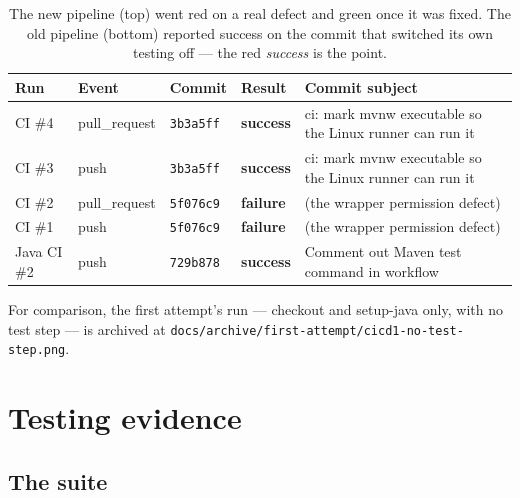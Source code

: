 \documentclass[11pt,a4paper]{article}
\newcommand{\code}[1]{\texttt{\small #1}}
\begin{document}
\begin{table}[h]
\centering
\small
\begin{tabularx}{\textwidth}{@{}l l l l X@{}}
\toprule
\textbf{Run} & \textbf{Event} & \textbf{Commit} & \textbf{Result} & \textbf{Commit subject} \\
\midrule
CI \#4 & pull\_request & \code{3b3a5ff} & \textcolor{good}{\textbf{success}} & ci: mark mvnw executable so the Linux runner can run it \\
CI \#3 & push & \code{3b3a5ff} & \textcolor{good}{\textbf{success}} & ci: mark mvnw executable so the Linux runner can run it \\
CI \#2 & pull\_request & \code{5f076c9} & \textcolor{bad}{\textbf{failure}} & (the wrapper permission defect) \\
CI \#1 & push & \code{5f076c9} & \textcolor{bad}{\textbf{failure}} & (the wrapper permission defect) \\
\midrule
Java CI \#2 & push & \code{729b878} & \textcolor{bad}{\textbf{success}} & Comment out Maven test command in workflow \\
\bottomrule
\end{tabularx}
\caption{The new pipeline (top) went red on a real defect and green once it was
fixed. The old pipeline (bottom) reported success on the commit that switched
its own testing off --- the red \emph{success} is the point.}
\end{table}

For comparison, the first attempt's run --- checkout and setup-java only, with
no test step --- is archived at
\code{docs/archive/first-attempt/cicd1-no-test-step.png}.


\section{Testing evidence}

\subsection{The suite}
\end{document}
